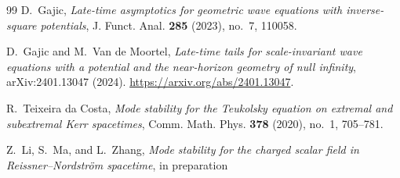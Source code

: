 \documentclass[11pt]{article}
\numberwithin{equation}{section}
\begin{document}
\begin{thebibliography}{99}
		D.~Gajic,
		\emph{Late-time asymptotics for geometric wave equations with
			inverse-square potentials},
		J. Funct. Anal. \textbf{285} (2023), no.~7, 110058.
		
		D.~Gajic and M.~Van de Moortel,
		\emph{Late-time tails for scale-invariant wave equations with a
			potential and the near-horizon geometry of null infinity},
		arXiv:2401.13047 (2024).
		\url{https://arxiv.org/abs/2401.13047}.
		
		R.~Teixeira da Costa,
		\emph{Mode stability for the Teukolsky equation on extremal and
			subextremal Kerr spacetimes},
		Comm. Math. Phys. \textbf{378} (2020), no.~1, 705--781.
		
		Z.~Li, S.~Ma, and L.~Zhang,
		\emph{Mode stability for the charged scalar field in
			Reissner--Nordstr\"om spacetime},
		in preparation
	\end{thebibliography}
\end{document}
